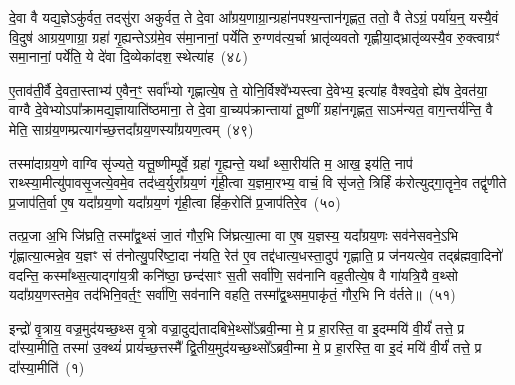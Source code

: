 दे॒वा वै यद्य॒ज्ञे\-ऽकु॑र्वत॒ तदसु॑रा अकुर्वत॒ ते दे॒वा आ᳚ग्रय॒णाग्रा॒न्ग्रहा॑नपश्य॒न्तान॑गृह्णत॒ ततो॒ वै ते\-ऽग्रं॒ पर्या॑य॒न्॒ यस्यै॒वं वि॒दुष॑ आग्रय॒णाग्रा॒ ग्रहा॑ गृ॒ह्यन्ते\-ऽग्र॑मे॒व स॑मा॒नानां॒ पर्ये॑ति रु॒ग्णव॑त्य॒र्चा भ्रातृ॑व्यवतो गृह्णीया॒द्भ्रातृ॑व्यस्यै॒व रु॒क्त्वाग्रꣳ॑ समा॒नानां॒ पर्ये॑ति॒ ये दे॑वा दि॒व्येका॑\-दश॒ स्थेत्या॑ह~(४८)

ए॒ताव॑ती॒र्वै दे॒वता॒स्ताभ्य॑ ए॒वैन॒ꣳ॒ सर्वा᳚भ्यो गृह्णात्ये॒ष ते॒ योनि॒र्विश्वे᳚भ्यस्त्वा दे॒वेभ्य॒ इत्या॑ह वैश्वदे॒वो ह्ये॑ष दे॒वत॑या॒ वाग्वै दे॒वेभ्यो\-ऽपा᳚क्रामद्य॒ज्ञायाति॑ष्ठमाना॒ ते दे॒वा वा॒च्यप॑क्रान्तायां तू॒ष्णीं ग्रहा॑नगृह्णत॒ सा\-ऽम॑न्यत॒ वाग॒न्तर्य॑न्ति॒ वै मेति॒ साग्र॑य॒णम्प्रत्याग॑च्छ॒त्तदा᳚ग्रय॒णस्या᳚ग्रयण॒त्वम्~(४९)

तस्मा॑दाग्रय॒णे वाग्वि सृ॑ज्यते॒ यत्तू॒ष्णीम्पूर्वे॒ ग्रहा॑ गृ॒ह्यन्ते॒ यथा᳚ थ्सा॒रीय॑ति म॒ आख॒ इय॑ति॒ नाप॑ राथ्स्या॒मीत्यु॑पावसृ॒जत्ये॒वमे॒व तद॑ध्व॒र्युरा᳚ग्रय॒णं गृ॑ही॒त्वा य॒ज्ञमा॒रभ्य॒ वाचं॒ वि सृ॑जते॒ त्रिर्\mbox{}हिं क॑रोत्युद्गा॒तॄने॒व तद्वृ॑णीते प्र॒जा\-प॑ति॒र्वा ए॒ष यदा᳚ग्रय॒णो यदा᳚ग्रय॒णं गृ॑ही॒त्वा हिं॑क॒रोति॑ प्र॒जा\-प॑तिरे॒व~(५०)

तत्प्र॒जा अ॒भि जि॑घ्रति॒ तस्मा᳚द्व॒थ्सं जा॒तं गौर॒भि जि॑घ्रत्या॒त्मा वा ए॒ष य॒ज्ञस्य॒ यदा᳚ग्रय॒णः सव॑नेसवने॒\-ऽभि गृ॑ह्णात्या॒त्मन्ने॒व य॒ज्ञꣳ सं त॑नोत्यु॒परि॑ष्टा॒दा न॑यति॒ रेत॑ ए॒व तद्द॑धात्य॒धस्ता॒दुप॑ गृह्णाति॒ प्र ज॑नयत्ये॒व तद्ब्र॑ह्मवा॒दिनो॑ वदन्ति॒ कस्मा᳚थ्स॒त्याद्गा॑य॒त्री कनि॑ष्ठा॒ छन्द॑साꣳ स॒ती सर्वा॑णि॒ सव॑नानि वह॒तीत्ये॒ष वै गा॑यत्रि॒यै व॒थ्सो यदा᳚ग्रय॒णस्तमे॒व तद॑भिनि॒वर्त॒ꣳ॒ सर्वा॑णि॒ सव॑नानि वहति॒ तस्मा᳚द्व॒थ्सम॒पाकृ॑तं॒ गौर॒भि नि व॑र्तते॥~(५१)

{\anuvakamend[{आ॒हा॒ग्र॒य॒ण॒त्वं प्र॒जा\-प॑तिरे॒वेति॑ विꣳश॒तिश्च॑}]}%


{\anuvakamend[{इन्द्रो॑ वृ॒त्रायायु॒र्वै य॒ज्ञेन॑ सुव॒र्गायेन्द्रो॑ म॒रुद्भि॒रदि॑तिरन्तर्यामपा॒त्रेण॑ प्रा॒ण उ॑पाꣳशुपा॒त्रेणेन्द्रो॑ वृ॒त्रम॑ह॒न्तस्य॒ ग्रहा॒न्॒ वै प्रान्यान्येका॑\-दश}]}%
{}

\setcounter{anuvakam}{0}
इन्द्रो॑ वृ॒त्राय॒ वज्र॒मुद॑यच्छ॒थ्स वृ॒त्रो वज्रा॒दुद्य॑तादबिभे॒थ्सो᳚\-ऽब्रवी॒न्मा मे॒ प्र हा॒रस्ति॒ वा इ॒दम्मयि॑ वी॒र्यं॑ तत्ते॒ प्र दा᳚स्या॒मीति॒ तस्मा॑ उ॒क्थ्यं॑ प्राय॑च्छ॒त्तस्मै᳚ द्वि॒तीय॒मुद॑यच्छ॒थ्सो᳚\-ऽब्रवी॒न्मा मे॒ प्र हा॒रस्ति॒ वा इ॒दं मयि॑ वी॒र्यं॑ तत्ते॒ प्र दा᳚स्या॒मीति॑~(१)

